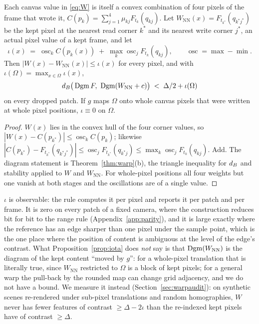 \begin{proposition}
\label{prop:iota}
Each canvas value in \eqref{eq:W} is itself a convex combination of four pixels of the frame that wrote it, $C(p_k) = \sum_{j=1}^{4} \mu_{kj} F_{t_k}(q_{kj})$. Let $W_{\mathrm{NN}}(x) = F_{t_{k^*}}(q_{k^* j^*})$ be the kept pixel at the nearest read corner $k^*$ and its nearest write corner $j^*$, an actual pixel value of a kept frame, and let
\[
\iota(x) \;=\; \operatorname{osc}_k C(p_k(x)) \;+\; \max_k \operatorname{osc}_j F_{t_k}(q_{kj}),
\qquad \operatorname{osc} = \max - \min .
\]
Then $|W(x) - W_{\mathrm{NN}}(x)| \le \iota(x)$ for every pixel, and with $\iota(\Omega) = \max_{x \in \Omega} \iota(x)$,
\[
d_B\big(\operatorname{Dgm} F,\ \operatorname{Dgm}(W_{\mathrm{NN}} + c)\big) \;<\; \Delta/2 + \iota(\Omega)
\]
on every dropped patch. If $g$ maps $\Omega$ onto whole canvas pixels that were written at whole pixel positions, $\iota \equiv 0$ on $\Omega$.
\end{proposition}

\begin{proof}
$W(x)$ lies in the convex hull of the four corner values, so $|W(x) - C(p_{k^*})| \le \operatorname{osc}_k C(p_k)$; likewise $|C(p_{k^*}) - F_{t_{k^*}}(q_{k^* j^*})| \le \operatorname{osc}_j F_{t_{k^*}}(q_{k^* j}) \le \max_k \operatorname{osc}_j F_{t_k}(q_{kj})$. Add. The diagram statement is Theorem~\ref{thm:warp}(b), the triangle inequality for $d_B$ and stability applied to $W$ and $W_{\mathrm{NN}}$. For whole-pixel positions all four weights but one vanish at both stages and the oscillations are of a single value.
\end{proof}

$\iota$ is observable: the rule computes it per pixel and reports it per patch and per frame. It is zero on every patch of a fixed camera, where the construction reduces bit for bit to the range rule (Appendix~\ref{app:parity}), and it is large exactly where the reference has an edge sharper than one pixel under the sample point, which is the one place where the position of content is ambiguous at the level of the edge's contrast. What Proposition~\ref{prop:iota} does \emph{not} say is that $\operatorname{Dgm}(W_{\mathrm{NN}})$ is the diagram of the kept content ``moved by $g$'': for a whole-pixel translation that is literally true, since $W_{\mathrm{NN}}$ restricted to $\Omega$ is a block of kept pixels; for a general warp the pull-back by the rounded map can change grid adjacency, and we do not have a bound. We measure it instead (Section~\ref{sec:warpaudit}): on synthetic scenes re-rendered under sub-pixel translations and random homographies, $W$ never has fewer features of contrast $\ge \Delta - 2\iota$ than the re-indexed kept pixels have of contrast $\ge \Delta$.

